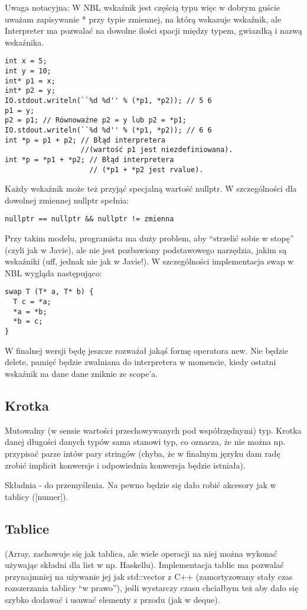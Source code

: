 \documentclass[a4paper,10pt]{scrartcl}
\begin{document}
Uwaga notacyjna: W NBL wskaźnik jest częścią typu więc w dobrym guście uważam zapisywanie * przy typie zmiennej, na którą wskazuje wskaźnik, ale
Interpreter ma pozwalać na dowolne ilości spacji między typem, gwiazdką i nazwą wskaźnika.

\begin{lstlisting}
int x = 5;
int y = 10;
int* p1 = x;
int* p2 = y;
IO.stdout.writeln(``%d %d'' % (*p1, *p2)); // 5 6
p1 = y;
p2 = p1; // Równoważne p2 = y lub p2 = *p1;
IO.stdout.writeln(``%d %d'' % (*p1, *p2)); // 6 6
int *p = p1 + p2; // Błąd interpretera 
                  //(wartość p1 jest niezdefiniowana).
int *p = *p1 + *p2; // Błąd interpretera 
                    // (*p1 + *p2 jest rvalue).
\end{lstlisting}

Każdy wskaźnik może też przyjąć specjalną wartość nullptr. W szczególności dla dowolnej zmiennej nullptr spełnia:
\begin{lstlisting}
nullptr == nullptr && nullptr != zmienna
\end{lstlisting}

Przy takim modelu, programista ma duży problem, aby ``strzelić sobie w stopę'' (czyli jak w Javie), ale nie jest pozbawiony podstawowego narzędzia,
jakim są wskaźniki (uff, jednak nie jak w Javie!). W szczególności implementacja swap w NBL wygląda następująco:
\begin{lstlisting}
swap T (T* a, T* b) {
  T c = *a;
  *a = *b;
  *b = c; 
}
\end{lstlisting}

W finalnej wersji będę jeszcze rozważał jakąś formę operatora new. Nie będzie delete, pamięć będzie zwalniana do interpretera w momencie, kiedy
ostatni wskaźnik na dane dane zniknie ze scope'a.

\subsection{Krotka}
Mutowalny (w sensie wartości przechowywanych pod współrzędnymi) typ. Krotka danej długości danych typów sama stanowi typ, co oznacza, że nie można
np. przypisać parze intów pary stringów (chyba, że w finalnym języku dam radę zrobić implicit konwersje i odpowiednia konwersja będzie istniała).

Składnia - do przemyślenia. Na pewno będzie się dało robić akcesory jak w tablicy ([numer]).

\subsection{Tablice}
(Array, zachowuje się jak tablica, ale wiele operacji na niej można wykonać
używając składni dla list w np. Haskellu). Implementacja tablic ma pozwalać przynajmniej na używanie jej jak std::vector z C++ (zamortyzowany stały
czas rozszerzania tablicy ``w prawo''), jeśli wystarczy czasu chciałbym też aby dało się szybko dodawać i usuwać elementy z przodu (jak w deque).
\end{document}
